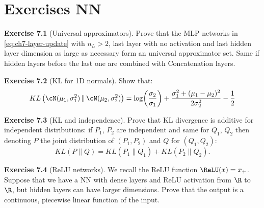 \section{Exercises NN}

\begin{tcolorbox}[remarkbox]
\textbf{Exercise 7.1} (Universal approximators). Prove that the MLP networks in \eqref{eq:ch7-layer-update} with $n_L > 2$, last layer with no activation and last hidden layer dimension as large as necessary form an universal approximator set. Same if hidden layers before the last one are combined with Concatenation layers.
\end{tcolorbox}

\begin{tcolorbox}[remarkbox]
\textbf{Exercise 7.2} (KL for 1D normals). Show that:
\begin{equation}\label{eq:ch7-KL-normals}
  KL\left( \cN(\mu_1, \sigma_1^2) \,\|\, \cN(\mu_2, \sigma_2^2) \right) = \log\!\left( \frac{\sigma_2}{\sigma_1} \right) + \frac{\sigma_1^2 + (\mu_1 - \mu_2)^2}{2 \sigma_2^2} - \frac{1}{2}
\end{equation}
\end{tcolorbox}

\begin{tcolorbox}[remarkbox]
\textbf{Exercise 7.3} (KL and independence). Prove that KL divergence is additive for independent distributions: if $P_1$, $P_2$ are independent and same for $Q_1$, $Q_2$ then denoting $P$ the joint distribution of $(P_1, P_2)$ and $Q$ for $(Q_1, Q_2)$:
\begin{equation}\label{eq:ch7-KL-additive}
  KL(P \| Q) = KL(P_1 \| Q_1) + KL(P_2 \| Q_2).
\end{equation}
\end{tcolorbox}

\begin{tcolorbox}[remarkbox]
\textbf{Exercise 7.4} (ReLU networks). We recall the ReLU function $\ReLU(x) = x_+$. Suppose that we have a NN with dense layers and ReLU activation from $\R$ to $\R$, but hidden layers can have larger dimensions. Prove that the output is a continuous, piecewise linear function of the input.
\end{tcolorbox}

